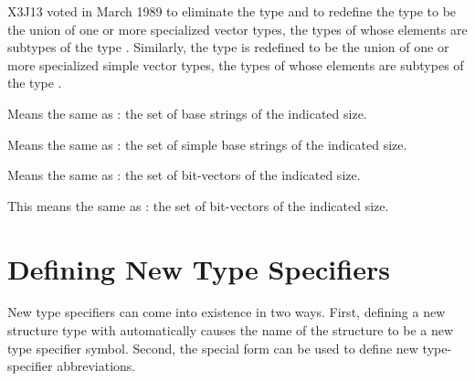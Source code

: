 \begin{newer}
X3J13 voted in March 1989 
to eliminate the type  and to redefine the type
 to be the union of one or more specialized vector
types, the types of whose elements are subtypes of the type .
Similarly, the type
 is redefined to be the union of one or more specialized
simple vector
types, the types of whose elements are subtypes of the type .

\begin{flushdesc}
\item[\cd{(base-string \emph{size})}]
Means the same as
: the set of base
strings of the indicated size.


\item[\cd{(simple-base-string \emph{size})}]
Means the same
as : the set of simple base
strings of the indicated size.
\end{flushdesc}
\end{newer}

\begin{flushdesc}
\item[\cd{(bit-vector \emph{size})}]
Means the same as :
the set of bit-vectors of the indicated size.

\item[\cd{(simple-bit-vector \emph{size})}]
This means the same as
: the set of bit-vectors of
the indicated size.
\end{flushdesc}

\section{Defining New Type Specifiers}

New type specifiers can come into existence in two ways.
First, defining a new structure type with  automatically
causes the name of the structure to be a new type specifier symbol.
Second, the  special form can be used to define new type-specifier
abbreviations.

